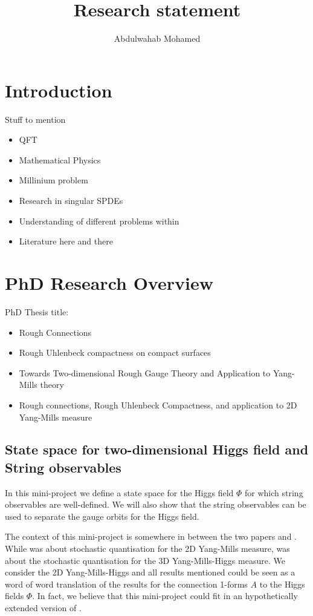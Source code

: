 \documentclass[11pt]{article}
\title{Research statement}
\author{Abdulwahab Mohamed}
\numberwithin{equation}{section}
\theoremstyle{definition}
\theoremstyle{remark}
\newcommand{\1}{\mathbf 1}
\newcommand{\<}{\langle}
\renewcommand{\>}{\rangle}
\begin{document}
\maketitle


\section{Introduction}
Stuff to mention 
\begin{itemize}
    \item QFT
    \item Mathematical Physics
    \item Millinium problem
    \item Research in singular SPDEs
    \item Understanding of different problems within
    \item Literature here and there
\end{itemize}
\section{PhD Research Overview}
PhD Thesis title: 
\begin{itemize}
    \item Rough Connections
    \item Rough Uhlenbeck compactness on compact surfaces
    \item  Towards Two-dimensional Rough Gauge Theory and Application to Yang-Mills theory
    \item Rough connections, Rough Uhlenbeck Compactness, and application to 2D Yang-Mills measure 
\end{itemize}

\subsection{State space for two-dimensional Higgs field and String observables}
In this mini-project we define a state space for the Higgs field $\Phi$ for which string observables are well-defined. We will also show that the string observables can be used to separate the gauge orbits for the Higgs field. 

The context of this mini-project is somewhere in between the two papers \cite{CCHS_2D_YM} and \cite{CCHS_3D_YMH}. While \cite{CCHS_2D_YM} was about stochastic quantisation for the 2D Yang-Mills measure, \cite{CCHS_3D_YMH} was about the stochastic quantisation for the 3D Yang-Mills-Higgs measure. We consider the 2D Yang-Mills-Higgs and all results mentioned could be seen as a word of word translation of the results for the connection 1-forms $A$ to the Higgs fields $\Phi$. In fact, we believe that this mini-project could fit in an hypothetically extended version of \cite{CCHS_2D_YM}.  
\end{document}
